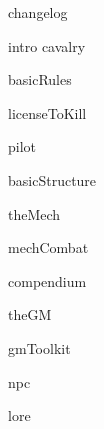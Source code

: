 \documentclass[11pt]{report}
\begin{document}
{changelog}
\newpage

\setcounter{tocdepth}{7}

\tableofcontents
\newpage


{intro}
{cavalry}
\newpage

{basicRules}
\newpage


{licenseToKill}
\newpage

{pilot}
\newpage

{basicStructure}
\newpage


{theMech}
\newpage

{mechCombat}
\newpage


{compendium}
\newpage

{theGM}
\newpage


{gmToolkit}
\newpage


{npc}
\newpage


{lore}
\newpage
\end{document}
